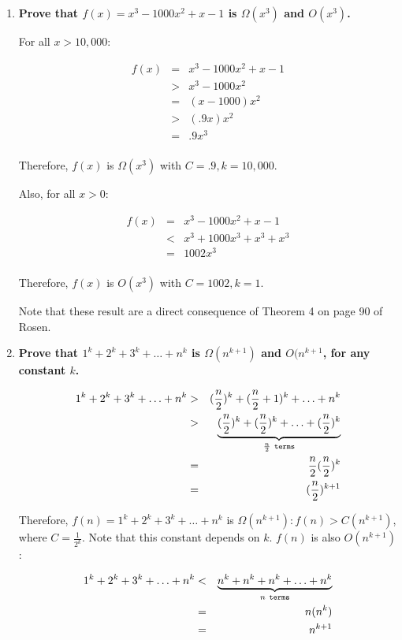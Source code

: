 \documentclass[12pt]{amsart}
\begin{document}
\begin{enumerate}
\medskip

\item {\bf Prove that $f(x) = x^3 - 1000x^2 + x - 1$ is $\Omega(x^3)$ and $O(x^3)$.}

For all $x > 10,000$:

\begin{eqnarray*}
f(x) & = & x^3 - 1000x^2 + x - 1 \\
& > & x^3 - 1000x^2 \\
& = & (x-1000)x^2 \\
& > & (.9x)x^2 \\
& = & .9x^3 \\
\end{eqnarray*}

Therefore, $f(x)$ is $\Omega(x^3)$ with $C = .9, k = 10,000$.

Also, for all $x > 0$:

\begin{eqnarray*}
f(x) & = & x^3 - 1000x^2 + x - 1 \\
& < & x^3 + 1000x^3 + x^3 + x^3 \\
& = & 1002x^3 \\
\end{eqnarray*}

Therefore, $f(x)$ is $O(x^3)$ with $C = 1002, k = 1$.

Note that these result are a direct consequence of Theorem 4 on page
90 of Rosen.

\medskip

\item {\bf Prove that $1^k + 2^k + 3^k + \ldots + n^k$ is $\Omega(n^{k+1})$ and $O(n^{k+1}$, for any constant $k$.}

\begin{eqnarray*}
1^k + 2^k + 3^k + \ldots + n^k & > & (\frac{n}{2})^k + (\frac{n}{2}+1)^k + \ldots + n^k \\
& > & \underbrace{(\frac{n}{2})^k + (\frac{n}{2})^k + \ldots + (\frac{n}{2})^k}_{\frac{n}{2} \ \tt{terms}} \\
& = & \frac{n}{2}(\frac{n}{2})^k \\
& = & (\frac{n}{2})^{k+1} \\
\end{eqnarray*}

Therefore, $f(n) = 1^k + 2^k + 3^k + \ldots + n^k$ is
$\Omega(n^{k+1}): f(n) > C(n^{k+1})$, where $C = \frac{1}{2^k}$.  Note
that this constant depends on $k$.  $f(n)$ is also $O(n^{k+1})$:

\begin{eqnarray*}
1^k + 2^k + 3^k + \ldots + n^k & < & \underbrace{n^k + n^k + n^k + \ldots + n^k}_{n \ \tt{terms}} \\
& = & n(n^k) \\
& = & n^{k+1} \\
\end{eqnarray*}


\end{enumerate}
\end{document}

